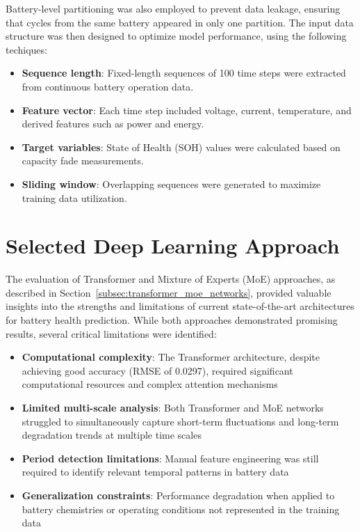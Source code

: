 Battery-level partitioning was also employed to prevent data leakage, ensuring that cycles from the same battery appeared in only one partition. The input data structure was then designed to optimize model performance, using the following techiques:

\begin{itemize}
    \item \textbf{Sequence length}: Fixed-length sequences of 100 time steps were extracted from continuous battery operation data.
    \item \textbf{Feature vector}: Each time step included voltage, current, temperature, and derived features such as power and energy.
    \item \textbf{Target variables}: State of Health (SOH) values were calculated based on capacity fade measurements.
    \item \textbf{Sliding window}: Overlapping sequences were generated to maximize training data utilization.
\end{itemize}

\section{Selected Deep Learning Approach}
\label{sec:timesnet_model}

The evaluation of Transformer and Mixture of Experts (MoE) approaches, as described in Section~\ref{subsec:transformer_moe_networks}, provided valuable insights into the strengths and limitations of current state-of-the-art architectures for battery health prediction. While both approaches demonstrated promising results, several critical limitations were identified:

\begin{itemize}
    \item \textbf{Computational complexity}: The Transformer architecture, despite achieving good accuracy (RMSE of 0.0297), required significant computational resources and complex attention mechanisms
    \item \textbf{Limited multi-scale analysis}: Both Transformer and MoE networks struggled to simultaneously capture short-term fluctuations and long-term degradation trends at multiple time scales
    \item \textbf{Period detection limitations}: Manual feature engineering was still required to identify relevant temporal patterns in battery data
    \item \textbf{Generalization constraints}: Performance degradation when applied to battery chemistries or operating conditions not represented in the training data
\end{itemize}

